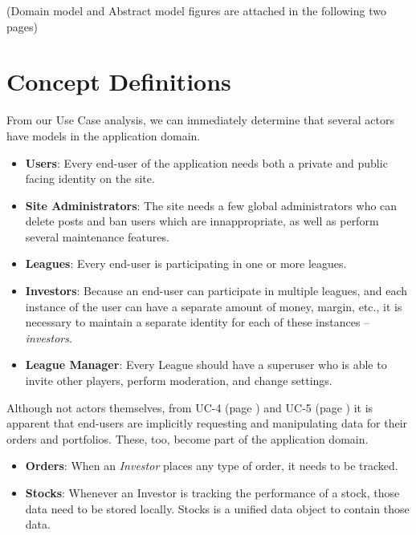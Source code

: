 (Domain model and Abstract model figures are attached in the following two pages) \\

\newpage

\section{Concept Definitions}

From our Use Case analysis, we can immediately determine that several
actors have models in the application domain.

\begin{itemize}
\item \textbf{Users}: Every end-user of the application needs both a private and
public facing identity on the site.

\item \textbf{Site Administrators}: The site needs a few global administrators
who can delete posts and ban users which are innappropriate, as well
as perform several maintenance features.

\item \textbf{Leagues}: Every end-user is participating in one or more leagues.

\item \textbf{Investors}: Because an end-user can participate in multiple leagues,
and each instance of the user can have a separate amount of money, margin,
etc., it is necessary to maintain a separate identity for each of these 
instances -- \emph{investors}.

\item \textbf{League Manager}: Every League should have a superuser who is 
able to invite other players, perform moderation, and change settings.
\end{itemize}

Although not actors themselves, from UC-4 (page \pageref{UC-4}) and UC-5 
(page \pageref{UC-5}) it is apparent that end-users are implicitly 
requesting and manipulating data for their orders and portfolios. These,
too, become part of the application domain.

\begin{itemize}
\item \textbf{Orders}: When an \emph{Investor} places any type of order, it
needs to be tracked. 
\item \textbf{Stocks}: Whenever an Investor is tracking the performance of a
stock, those data need to be stored locally. Stocks is a unified 
data object to contain those data.
\end{itemize}

